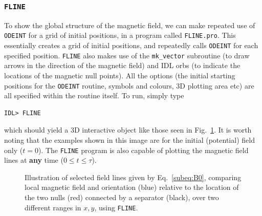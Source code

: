 \documentclass[a4paper,11pt,usenames,dvipsnames]{article}
\begin{document}
\subsubsection{\texttt{FLINE}}
To show the global structure of the magnetic field, we can make repeated use of \texttt{ODEINT} for a grid of initial positions, in a program called \texttt{FLINE.pro}. This essentially creates a grid of initial positions, and repeatedly calls \texttt{ODEINT} for each specified position. \texttt{FLINE} also makes use of the \texttt{mk\_vector} subroutine (to draw arrows in the direction of the magnetic field) and IDL orbs (to indicate the locations of the magnetic null points). 
All the options (the initial starting positions for the \texttt{ODEINT} routine, symbols and colours, 3D plotting area etc) are all specified within the routine itself. To run, simply type
\begin{verbatim}
IDL> FLINE
\end{verbatim}
which should yield a 3D interactive object like those seen in Fig.~\ref{fig:myfield}. It is worth noting that the examples shown in this image are for the initial (potential) field only ($t=0$). The \texttt{FLINE} program is also capable of plotting the magnetic field lines at {\bf{any}} time ($0\leq t\leq \tau$).
   \begin{figure}[t]
    \centering
    \caption{Illustration of selected field lines given by Eq.~\ref{subeq:B0}, comparing local magnetic field and orientation (blue) relative to the location of the two nulls (red) connected by a separator (black), over two different ranges in $x,y$, using \texttt{FLINE}.} 
    \label{fig:myfield}
   \end{figure}
\end{document}
